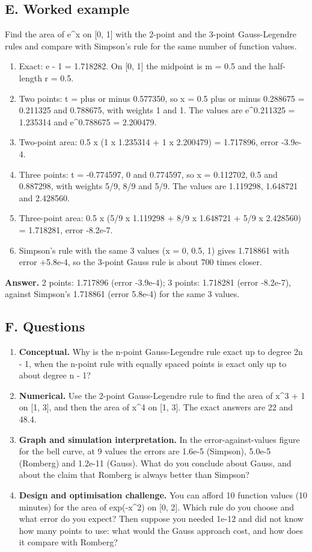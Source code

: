 \documentclass[11pt,a4paper]{article}
\begin{document}
\subsection*{E. Worked example}
Find the area of e\textasciicircum{}x on [0, 1] with the 2-point and the 3-point Gauss-Legendre rules and compare with Simpson's rule for the same number of function values.
\begin{enumerate}[nosep]
\item Exact: e - 1 = 1.718282. On [0, 1] the midpoint is m = 0.5 and the half-length r = 0.5.
\item Two points: t = plus or minus 0.577350, so x = 0.5 plus or minus 0.288675 = 0.211325 and 0.788675, with weights 1 and 1. The values are e\textasciicircum{}0.211325 = 1.235314 and e\textasciicircum{}0.788675 = 2.200479.
\item Two-point area: 0.5 x (1 x 1.235314 + 1 x 2.200479) = 1.717896, error -3.9e-4.
\item Three points: t = -0.774597, 0 and 0.774597, so x = 0.112702, 0.5 and 0.887298, with weights 5/9, 8/9 and 5/9. The values are 1.119298, 1.648721 and 2.428560.
\item Three-point area: 0.5 x (5/9 x 1.119298 + 8/9 x 1.648721 + 5/9 x 2.428560) = 1.718281, error -8.2e-7.
\item Simpson's rule with the same 3 values (x = 0, 0.5, 1) gives 1.718861 with error +5.8e-4, so the 3-point Gauss rule is about 700 times closer.
\end{enumerate}
\textbf{Answer.} 2 points: 1.717896 (error -3.9e-4); 3 points: 1.718281 (error -8.2e-7), against Simpson's 1.718861 (error 5.8e-4) for the same 3 values.

\subsection*{F. Questions}
\begin{enumerate}[nosep]
\item \textbf{Conceptual.} Why is the n-point Gauss-Legendre rule exact up to degree 2n - 1, when the n-point rule with equally spaced points is exact only up to about degree n - 1?
\item \textbf{Numerical.} Use the 2-point Gauss-Legendre rule to find the area of x\textasciicircum{}3 + 1 on [1, 3], and then the area of x\textasciicircum{}4 on [1, 3]. The exact answers are 22 and 48.4.
\item \textbf{Graph and simulation interpretation.} In the error-against-values figure for the bell curve, at 9 values the errors are 1.6e-5 (Simpson), 5.0e-5 (Romberg) and 1.2e-11 (Gauss). What do you conclude about Gauss, and about the claim that Romberg is always better than Simpson?
\item \textbf{Design and optimisation challenge.} You can afford 10 function values (10 minutes) for the area of exp(-x\textasciicircum{}2) on [0, 2]. Which rule do you choose and what error do you expect? Then suppose you needed 1e-12 and did not know how many points to use: what would the Gauss approach cost, and how does it compare with Romberg?
\end{enumerate}
\end{document}

